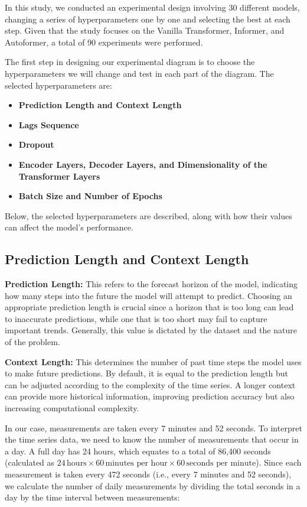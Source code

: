 In this study, we conducted an experimental design involving 30 different models, changing a series of hyperparameters one by one and selecting the best at each step. Given that the study focuses on the Vanilla Transformer, Informer, and Autoformer, a total of 90 experiments were performed.

The first step in designing our experimental diagram is to choose the hyperparameters we will change and test in each part of the diagram. The selected hyperparameters are:

\begin{itemize}
    \item \textbf{Prediction Length and Context Length}
    \item \textbf{Lags Sequence}
    \item \textbf{Dropout}
    \item \textbf{Encoder Layers, Decoder Layers, and Dimensionality of the Transformer Layers}
    \item \textbf{Batch Size and Number of Epochs}
\end{itemize}

Below, the selected hyperparameters are described, along with how their values can affect the model's performance.


\subsection{Prediction Length and Context Length}

\textbf{Prediction Length:} This refers to the forecast horizon of the model, indicating how many steps into the future the model will attempt to predict. Choosing an appropriate prediction length is crucial since a horizon that is too long can lead to inaccurate predictions, while one that is too short may fail to capture important trends. Generally, this value is dictated by the dataset and the nature of the problem.

\vspace{10pt}

\noindent\textbf{Context Length:} This determines the number of past time steps the model uses to make future predictions. By default, it is equal to the prediction length but can be adjusted according to the complexity of the time series. A longer context can provide more historical information, improving prediction accuracy but also increasing computational complexity.

In our case, measurements are taken every 7 minutes and 52 seconds. To interpret the time series data, we need to know the number of measurements that occur in a day. A full day has 24 hours, which equates to a total of 86,400 seconds (calculated as \(24 \, \text{hours} \times 60 \, \text{minutes per hour} \times 60 \, \text{seconds per minute}\)). Since each measurement is taken every 472 seconds (i.e., every 7 minutes and 52 seconds), we calculate the number of daily measurements by dividing the total seconds in a day by the time interval between measurements:


